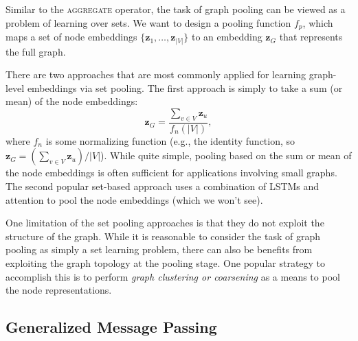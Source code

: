 \documentclass[10pt]{book}
\begin{document}
Similar to the \textsc{aggregate} operator, the task of graph pooling can be viewed as a problem of learning over sets. We want to design a pooling function $f_p$, which maps a set of node embeddings $\{\mathbf z_1, \ldots, \mathbf z_{|V|} \}$ to an embedding $\mathbf z_G$ that represents the full graph.

There are two approaches that are most commonly applied for learning graph-level embeddings via set pooling. The first approach is simply
to take a sum (or mean) of the node embeddings:
\begin{equation}
    \mathbf z_G = \frac{\sum_{v \in V} \mathbf z_u}{f_n(|V|)},
\end{equation}
where $f_n$ is some normalizing function (e.g., the identity function, so $\mathbf z_G = (\sum_{v \in V} \mathbf z_u)/|V|$). While quite simple, pooling based on the sum or mean of the node embeddings is often sufficient for applications involving small graphs. The second popular set-based approach uses a combination of LSTMs and attention to pool the node embeddings (which we won't see).

One limitation of the set pooling approaches is that they do not exploit the structure of the graph. While it is reasonable to consider the task of graph pooling as simply a set learning problem, there can also be benefits from exploiting the graph topology at the pooling stage. One popular strategy to accomplish this is to perform \emph{graph clustering or coarsening} as a means to pool the node representations.

\subsection{Generalized Message Passing}
\end{document}
